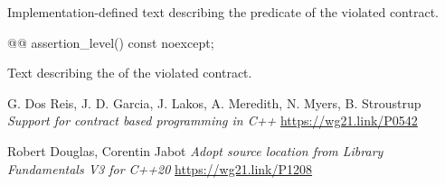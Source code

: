 \documentclass{wg21}
\begin{document}
\begin{itemdescr}
	\pnum
	\returns Implementation-defined text describing
	the predicate of the violated contract.
\end{itemdescr}

%
\begin{itemdecl}
	@@ assertion_level() const noexcept;
\end{itemdecl}

\begin{itemdescr}
	\pnum
	\returns Text describing the 
	of the violated contract.
\end{itemdescr}


\begin{thebibliography}{9}
	
	G. Dos Reis, J. D. Garcia, J. Lakos, A. Meredith, N. Myers, B. Stroustrup
	\emph{Support for contract based programming in C++}
	\url{https://wg21.link/P0542}
	
	Robert Douglas, Corentin Jabot
	\emph{Adopt source location from Library Fundamentals V3 for C++20}
	\url{https://wg21.link/P1208}		
	
\end{thebibliography}
\end{document}
